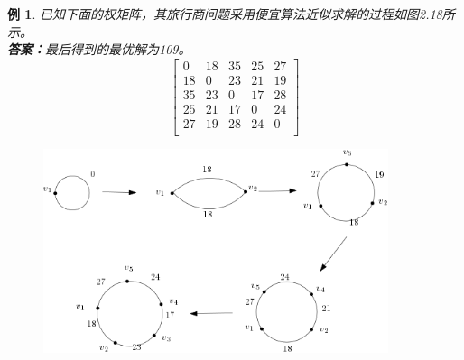 \documentclass[11pt,a4paper,openany]{book}
\newtheorem{sample}{\textbf{例}}[section]
\begin{document}
\begin{sample}\K
已知下面的权矩阵，其旅行商问题采用便宜算法近似求解的过程如图2.18所示。\\
\textbf{答案：}最后得到的最优解为109。
$$\left[
  \begin{array}{ccccc}
    0  & 18 & 35 & 25 & 27 \\
    18 & 0 & 23 & 21 & 19 \\
    35 & 23 & 0 & 17 & 28 \\
    25 & 21 & 17 & 0 & 24 \\
    27 & 19 & 28 & 24 & 0 \\
  \end{array}
\right]$$
\begin{figure}[H]
  \centering
  \includegraphics[width=0.9\textwidth]{2.19.png}
  \caption{}
\end{figure}

\end{sample}
\end{document}
